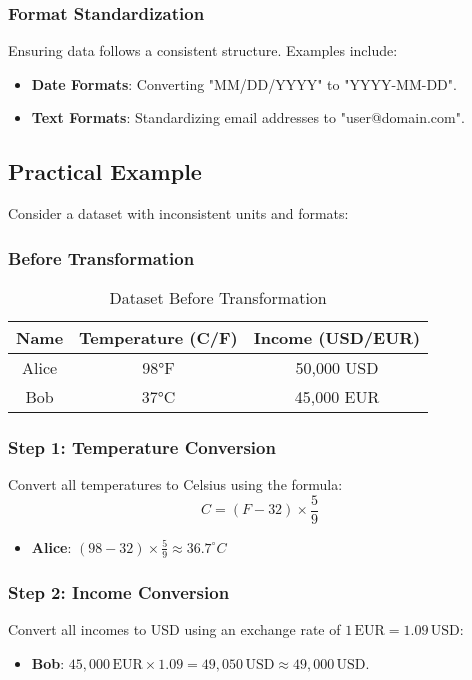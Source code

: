 \documentclass[12pt]{article}
\begin{document}
\subsubsection{Format Standardization}
Ensuring data follows a consistent structure. Examples include:
\begin{itemize}
    \item \textbf{Date Formats}: Converting "MM/DD/YYYY" to "YYYY-MM-DD".
    \item \textbf{Text Formats}: Standardizing email addresses to "user@domain.com".
\end{itemize}

\subsection{Practical Example}

Consider a dataset with inconsistent units and formats:

\subsubsection{Before Transformation}

\begin{table}[h!]
    \centering
    \begin{tabular}{|c|c|c|}
        \hline
        \textbf{Name} & \textbf{Temperature (C/F)} & \textbf{Income (USD/EUR)} \\
        \hline
        Alice & 98°F & 50,000 USD \\
        Bob & 37°C & 45,000 EUR \\
        \hline
    \end{tabular}
    \caption{Dataset Before Transformation}
    \label{tab:before_transformation}
\end{table}

\subsubsection{Step 1: Temperature Conversion}
Convert all temperatures to Celsius using the formula:
\[
C = (F - 32) \times \frac{5}{9}
\]
\begin{itemize}
    \item \textbf{Alice}: \( (98 - 32) \times \frac{5}{9} \approx 36.7^\circ C \)
\end{itemize}

\subsubsection{Step 2: Income Conversion}
Convert all incomes to USD using an exchange rate of \( 1 \, \text{EUR} = 1.09 \, \text{USD} \):
\begin{itemize}
    \item \textbf{Bob}: \( 45,\!000 \, \text{EUR} \times 1.09 = 49,\!050 \, \text{USD} \approx 49,\!000 \, \text{USD} \).
\end{itemize}
\end{document}
